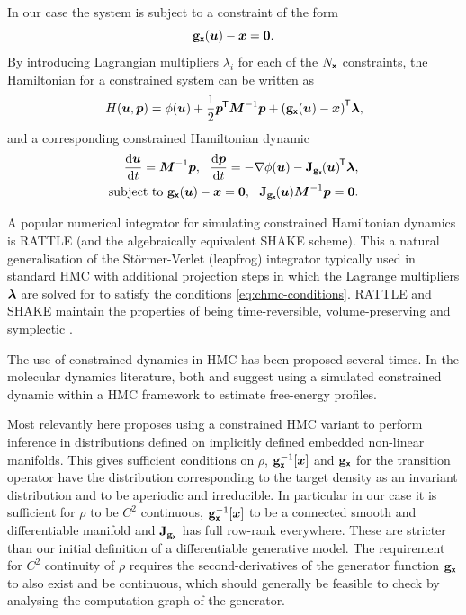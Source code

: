In our case the system is subject to a constraint of the form
\begin{equation}\label{eq:constraint-def}
  {\mathbf{g}}_{\boldsymbol{\mathsf{x}}}(\boldsymbol{u}) - \boldsymbol{x} = \boldsymbol{0}.
\end{equation}
By introducing Lagrangian multipliers $\lambda_i$ for each of the $N_{\boldsymbol{\mathsf{x}}}$ constraints, the Hamiltonian for a constrained system can be written as
\begin{equation}\label{eq:constrained_hamiltonian}
    H(\vct{u}, \vct{p}) = 
    \phi(\vct{u}) + \frac{1}{2}\vct{p}\tr\mtx{M}^{-1}\vct{p}
    + \lpa \genfunc_{\rvct{x}}(\vct{u}) - \vct{x} \rpa\tr\vct{\lambda},
\end{equation}
and a corresponding constrained Hamiltonian dynamic
\begin{align}\label{eq:constrained_hamiltonian_dynamics}
    \td{\vct{u}}{t} = \mtx{M}^{-1}\vct{p},
    ~~
    \td{\vct{p}}{t} = -\grad{\phi}{\vct{u}} - \jacob{\genfunc_{\rvct{x}}}{\vct{u}}\tr\vct{\lambda},
    \\
    \text{subject to }
    \genfunc_{\rvct{x}}(\vct{u}) - \vct{x} = \vct{0},
    ~~
    \jacob{\genfunc_{\rvct{x}}}{\vct{u}}\mtx{M}^{-1}\vct{p} = \vct{0}.\label{eq:chmc-conditions}
\end{align}

A popular numerical integrator for simulating constrained Hamiltonian dynamics is RATTLE \citep{andersen1983rattle} (and the algebraically equivalent SHAKE \citep{ryckaert1977numerical} scheme). This a natural generalisation of the St\"{o}rmer-Verlet (leapfrog) integrator typically used in standard \ac{HMC} with additional projection steps in which the Lagrange multipliers $\boldsymbol{\lambda}$ are solved for to satisfy the conditions \eqref{eq:chmc-conditions}. RATTLE and SHAKE maintain the properties of being time-reversible, volume-preserving and symplectic \citep{leimkuhler1994symplectic}.

The use of constrained dynamics in \ac{HMC} has been proposed several times. In the molecular dynamics literature, both \citep{hartmann2005constrained} and \citep{lelievre2012langevin} suggest using a simulated constrained dynamic within a \ac{HMC} framework to estimate free-energy profiles.

Most relevantly here \citep{brubaker2012family} proposes using a constrained \ac{HMC} variant to perform inference in distributions defined on implicitly defined embedded non-linear manifolds. This gives sufficient conditions on $\rho$, ${\mathbf{g}}_{\boldsymbol{\mathsf{x}}}^{-1}[\boldsymbol{x}]$ and ${\mathbf{g}}_{\boldsymbol{\mathsf{x}}}$ for the transition operator have the distribution corresponding to the target density as an invariant distribution and to be aperiodic and irreducible. In particular in our case it is sufficient for $\rho$ to be $C^2$ continuous, ${\mathbf{g}}_{\boldsymbol{\mathsf{x}}}^{-1}[\boldsymbol{x}]$ to be a connected smooth and differentiable manifold and $\mathbf{J}_{{\mathbf{g}}_{\boldsymbol{\mathsf{x}}}}$ has full row-rank everywhere. These are stricter than our initial definition of a differentiable generative model. The requirement for $C^2$ continuity of $\rho$ requires the second-derivatives of the generator function ${\mathbf{g}}_{\boldsymbol{\mathsf{x}}}$ to also exist and be continuous, which should generally be feasible to check by analysing the computation graph of the generator.

